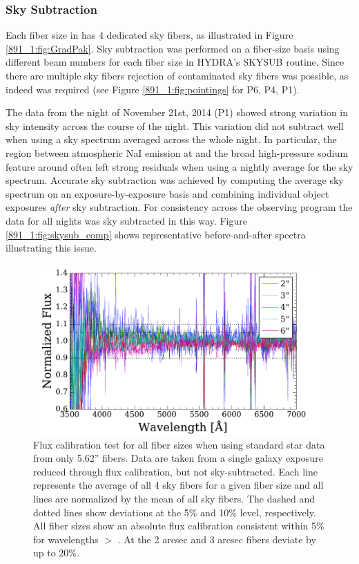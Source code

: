\subsubsection{Sky Subtraction}
\label{891_1:sec:skysub}

Each fiber size in \GP has 4 dedicated sky fibers, as illustrated in
Figure \ref{891_1:fig:GradPak}.  Sky subtraction was performed on a
fiber-size basis using different beam numbers for each fiber size in
HYDRA's SKYSUB routine.  Since there are multiple sky fibers rejection
of contaminated sky fibers was possible, as indeed was required (see
Figure \ref{891_1:fig:pointings} for P6, P4, P1).

The data from the night of November 21st, 2014 (P1) showed strong
variation in sky intensity across the course of the night. This
variation did not subtract well when using a sky spectrum averaged
across the whole night. In particular, the region between atmospheric
NaI emission at  and the broad high-pressure sodium
feature around  often left strong residuals when using
a nightly average for the sky spectrum. Accurate sky subtraction was
achieved by computing the average sky spectrum on an
exposure-by-exposure basis and combining individual object exposures
\emph{after} sky subtraction. For consistency across the observing
program the data for all nights was sky subtracted in this way. Figure
\ref{891_1:fig:skysub_comp} shows representative before-and-after spectra
illustrating this issue.

\begin{figure}
  \centering
  \includegraphics[width=\columnwidth]{891_1/figs/flux_cal_test.pdf}
  \caption[Comparison of flux calibration across multiple fiber
    sizes]{ \label{891_1:fig:sky_flux_comp}\fixspacing Flux
    calibration test for all fiber sizes when using standard star data
    from only 5.62'' fibers. Data are taken from a single galaxy
    exposure reduced through flux calibration, but not
    sky-subtracted. Each line represents the average of all 4 sky
    fibers for a given fiber size and all lines are normalized by the
    mean of all sky fibers. The dashed and dotted lines show
    deviations at the 5\% and 10\% level, respectively. All fiber
    sizes show an absolute flux calibration consistent within 5\% for
    wavelengths $>$ . At  the 2 arcsec
    and 3 arcsec fibers deviate by up to 20\%.}
\end{figure}

